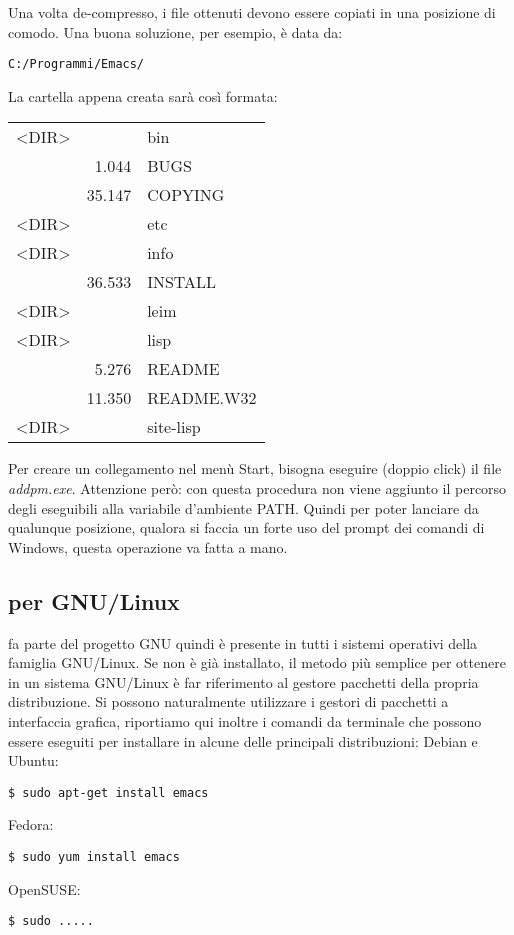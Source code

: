 \documentclass[10pt,a4paper]{article}
\begin{document}
Una volta de-compresso, i file ottenuti devono essere copiati in una
posizione di comodo. Una buona soluzione, per esempio, è data da:

\begin{Verbatim}
C:/Programmi/Emacs/
\end{Verbatim}

La cartella appena creata sarà così formata:
\begin{center}\ttfamily
 \begin{tabular}{lrl}
  <DIR>&        & bin       \\
       &  1.044 & BUGS      \\
       & 35.147 & COPYING   \\
  <DIR>&        & etc       \\
  <DIR>&        & info      \\
       & 36.533 & INSTALL   \\
  <DIR>&        & leim      \\
  <DIR>&        & lisp      \\
       &  5.276 & README    \\
       & 11.350 & README.W32\\
  <DIR>&        & site-lisp \\
 \end{tabular}
\end{center}

Per creare un collegamento nel menù \textsf{Start}, bisogna
eseguire (doppio click) il file \emph{addpm.exe}. Attenzione però: con questa
procedura non viene aggiunto il percorso degli eseguibili alla  
variabile d'ambiente \textsf{PATH}. Quindi per poter lanciare 
\emacs{} da qualunque posizione, qualora si faccia un forte uso del prompt dei
comandi di Windows, questa operazione va fatta a mano.

\subsection*{\emacs{} per GNU/Linux}
\label{sec:installlinux}
\emacs{} fa parte del progetto GNU quindi è presente in tutti i sistemi
operativi della famiglia GNU/Linux. Se non è già installato, il metodo più
semplice per ottenere \emacs{} in un sistema GNU/Linux è far riferimento al
gestore pacchetti della propria distribuzione. Si possono naturalmente
utilizzare i gestori di pacchetti a interfaccia grafica, riportiamo qui inoltre
i comandi da terminale che possono essere eseguiti per installare \emacs{} in
alcune delle principali distribuzioni: Debian e Ubuntu:
\begin{Verbatim}
$ sudo apt-get install emacs
\end{Verbatim}
Fedora:
\begin{Verbatim}
$ sudo yum install emacs
\end{Verbatim}
OpenSUSE: %
\begin{Verbatim}
$ sudo ..... 
\end{Verbatim} 
\end{document}
